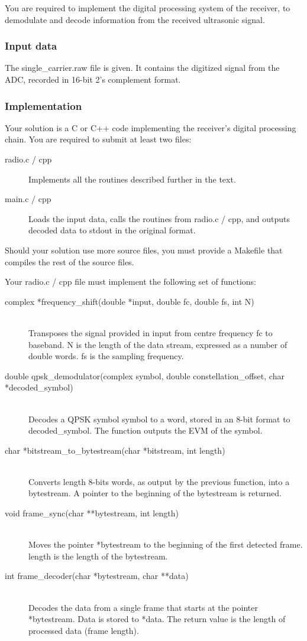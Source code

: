 \documentclass{article}
\begin{document}
You are required to implement the digital processing system of the receiver, to demodulate and decode information from the received ultrasonic signal.

\subsubsection{Input data}
The \textsf{single\_carrier.raw} file is given. It contains the digitized signal from the ADC, recorded in 16-bit 2's complement format.

\subsubsection{Implementation}
Your solution is a C or C++ code implementing the receiver's digital processing chain. You are required to submit at least two files:
\begin{description}
	\item[radio.c / cpp] Implements all the routines described further in the text.
	\item[main.c / cpp] Loads the input data, calls the routines from \textsf{radio.c / cpp}, and outputs decoded data to stdout in the original format.
\end{description}
Should your solution use more source files, you must provide a \textsf{Makefile} that compiles the rest of the source files.

Your radio.c / cpp file must implement the following set of functions:
\begin{description}
	\item[complex *frequency\_shift(double *input, double fc, double fs, int N)]
	\,\\ Transposes the signal provided in input from centre frequency \textsf{fc} to baseband. \textsf{N} is the length of the data stream, expressed as a number of double words. \textsf{fs} is the sampling frequency.
	\item[double qpsk\_demodulator(complex symbol, double constellation\_offset, char *decoded\_symbol)]
	\,\\ Decodes a QPSK symbol \textsf{symbol} to a word, stored in an 8-bit format to \textsf{decoded\_symbol}. The function outputs the EVM of the symbol.
	\item[char *bitstream\_to\_bytestream(char *bitstream, int length)]
	\,\\ Converts \textsf{length} 8-bits words, as output by the previous function, into a bytestream. A pointer to the beginning of the bytestream is returned.
	\item[void frame\_sync(char **bytestream, int length)]
	\,\\ Moves the pointer \textsf{*bytestream} to the beginning of the first detected frame. \textsf{length} is the length of the bytestream.
	\item[int frame\_decoder(char *bytestream, char **data)]
	\,\\ Decodes the data from a single frame that starts at the pointer \textsf{*bytestream}. Data is stored to \textsf{*data}. The return value is the length of processed data (frame length).
\end{description}
\end{document}
